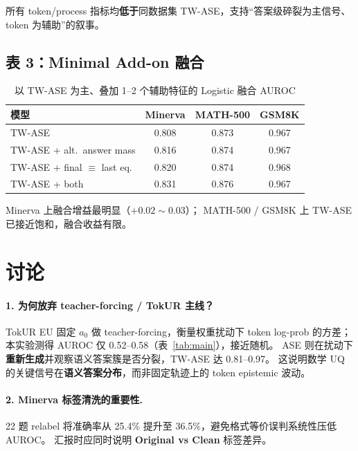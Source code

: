 \documentclass[11pt,a4paper]{article}
\begin{document}
所有 token/process 指标均\textbf{低于}同数据集 TW-ASE，支持``答案级碎裂为主信号、token 为辅助''的叙事。

\subsection{表 3：Minimal Add-on 融合}

\begin{table}[h]
  \centering
  \caption{以 TW-ASE 为主、叠加 1--2 个辅助特征的 Logistic 融合 AUROC}
  \label{tab:fusion}
  \begin{tabular}{lccc}
    \toprule
    模型 & Minerva & MATH-500 & GSM8K \\
    \midrule
    TW-ASE                              & 0.808 & 0.873 & 0.967 \\
    TW-ASE + alt.\ answer mass          & 0.816 & 0.874 & 0.967 \\
    TW-ASE + final $\equiv$ last eq.    & 0.820 & 0.874 & 0.968 \\
    TW-ASE + both                       & 0.831 & 0.876 & 0.967 \\
    \bottomrule
  \end{tabular}
\end{table}

Minerva 上融合增益最明显（$+0.02\sim0.03$）；
MATH-500 / GSM8K 上 TW-ASE 已接近饱和，融合收益有限。

\section{讨论}

\paragraph{1. 为何放弃 teacher-forcing / TokUR 主线？}
TokUR EU 固定 $a_0$ 做 teacher-forcing，衡量权重扰动下 token log-prob 的方差；
本实验测得 AUROC 仅 0.52--0.58（表~\ref{tab:main}），接近随机。
ASE 则在扰动下\textbf{重新生成}并观察语义答案簇是否分裂，TW-ASE 达 0.81--0.97。
这说明数学 UQ 的关键信号在\textbf{语义答案分布}，而非固定轨迹上的 token epistemic 波动。

\paragraph{2. Minerva 标签清洗的重要性.}
22 题 relabel 将准确率从 25.4\% 提升至 36.5\%，避免格式等价误判系统性压低 AUROC。
汇报时应同时说明 \textbf{Original vs Clean} 标签差异。
\end{document}
